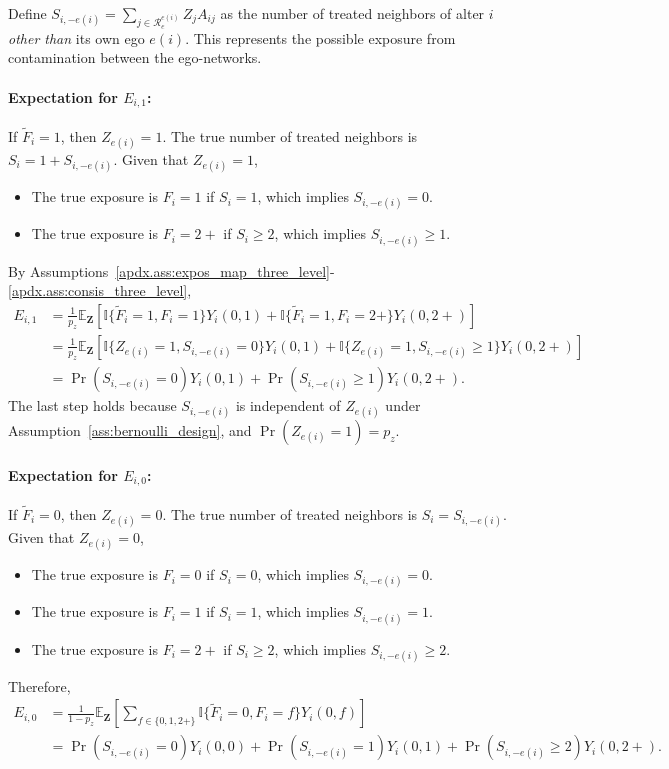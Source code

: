 \documentclass[11pt]{article}
\theoremstyle{definition}
\def \bZ {\boldsymbol{Z}}
\def \cR {\mathcal{R}}
\def \EX {\mathbb{E}}
\begin{document}
Define $S_{i, -e(i)} = \sum_{j \in \cR_e^{e(i)}} Z_j A_{ij}$ as the 
 number of treated neighbors of alter $i$ \emph{other than} its own ego $e(i)$.
  This represents the possible exposure from contamination between the ego-networks.

\paragraph{Expectation for $E_{i,1}$:}
If $\widetilde{F}_i=1$, then $Z_{e(i)}=1$. The true number of treated neighbors is $S_i = 1 + S_{i, -e(i)}$.
Given that $Z_{e(i)}=1$,
\begin{itemize}
    \item The true exposure is $F_i=1$ if $S_i = 1$, which implies $S_{i, -e(i)} = 0$.
    \item The true exposure is $F_i=2+$ if $S_i \ge 2$, which implies $S_{i, -e(i)} \ge 1$.
\end{itemize}
By Assumptions~\ref{apdx.ass:expos_map_three_level}-\ref{apdx.ass:consis_three_level},
\begin{align*}
    E_{i,1} &= \frac{1}{p_z} \EX_{\bZ}\left[ 
        \mathbb{I}\{\widetilde{F}_i=1, F_i=1\} Y_i(0, 1)
         + \mathbb{I}\{\widetilde{F}_i=1, F_i=2+\}Y_i(0, 2+)
             \right] \\
        &=
        \frac{1}{p_z} \EX_{\bZ}\left[ 
        \mathbb{I}\{Z_{e(i)}=1, S_{i, -e(i)}=0\} Y_i(0, 1)
         + \mathbb{I}\{Z_{e(i)}=1, S_{i, -e(i)}\geq 1\}Y_i(0, 2+)
             \right] \\
    &= \Pr(S_{i, -e(i)}=0) Y_i(0, 1) + \Pr(S_{i, -e(i)} \geq 1) Y_i(0, 2+).
\end{align*}
The last step holds because $S_{i, -e(i)}$ is independent of $Z_{e(i)}$ under Assumption~\ref{ass:bernoulli_design},
and $\Pr(Z_{e(i)}=1) = p_z$.

\paragraph{Expectation for $E_{i,0}$:}
If $\widetilde{F}_i=0$, then $Z_{e(i)}=0$. The true number of treated neighbors is $S_i = S_{i, -e(i)}$.
Given that $Z_{e(i)}=0$,
\begin{itemize}
    \item The true exposure is $F_i=0$ if $S_i = 0$, which implies $S_{i, -e(i)} = 0$.
    \item The true exposure is $F_i=1$ if $S_i = 1$, which implies $S_{i, -e(i)} = 1$.
    \item The true exposure is $F_i=2+$ if $S_i \geq 2$, which implies $S_{i, -e(i)} \geq 2$.
\end{itemize}
Therefore,
\begin{align*}
    E_{i,0} &= 
    \frac{1}{1-p_z} \EX_{\bZ}\left[ 
       \sum_{f \in \{0,1,2+\}} \mathbb{I}\{\widetilde{F}_i=0, F_i=f\} Y_i(0, f)
        \right] 
    \\ &= 
    \Pr(S_{i, -e(i)}=0) Y_i(0, 0) + \Pr(S_{i, -e(i)}=1) Y_i(0, 1) + \Pr(S_{i, -e(i)} \ge 2) Y_i(0, 2+).
\end{align*}
\end{document}
